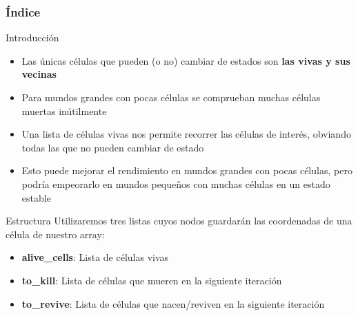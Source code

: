 \documentclass{mybeamer}
\institute{
	{\textsl{\large Anexo}}
	\\[1em]
	\textbf{\Large Como usar listas encadenadas en el Juego de la Vida}
}
\begin{document}
\begin{frame}
\titlepage
\end{frame}

\begin{frame}
\frametitle{Índice}
\tableofcontents
\end{frame}

\begin{framesec}{Introducción}
	\begin{itemize}
		\item Las únicas células que pueden (o no) cambiar de estados
			son \textbf{las vivas y sus vecinas}
		\item Para mundos grandes con pocas células se comprueban muchas
			células muertas inútilmente
		\item Una lista de células vivas nos permite recorrer las
			células de interés, obviando todas las que no pueden
			cambiar de estado
		\item Esto puede mejorar el rendimiento en mundos grandes con
			pocas células, pero podría empeorarlo en mundos pequeños
			con muchas células en un estado estable
	\end{itemize}
\end{framesec}

\begin{framesec}{Estructura}
	Utilizaremos tres listas cuyos nodos guardarán las coordenadas de una
	célula de nuestro array:
	\begin{itemize}
		\item \textbf{alive\_cells}: Lista de células vivas
		\item \textbf{to\_kill}: Lista de células que mueren en
			la siguiente iteración
		\item \textbf{to\_revive}: Lista de células que
			nacen/reviven en la siguiente iteración
	\end{itemize}
\end{framesec}
\end{document}
